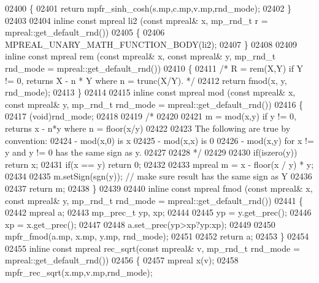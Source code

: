 \begin{DoxyCode}
{{02400 \{
02401     \textcolor{keywordflow}{return} mpfr\_sinh\_cosh(s.mp,c.mp,v.mp,rnd\_mode);
02402 \}
02403 
02404 \textcolor{keyword}{inline} \textcolor{keyword}{const} mpreal li2 (\textcolor{keyword}{const} mpreal& x, mp\_rnd\_t r = mpreal::get\_default\_rnd())
02405 \{
02406     MPREAL\_UNARY\_MATH\_FUNCTION\_BODY(li2);
02407 \}
02408 
02409 \textcolor{keyword}{inline} \textcolor{keyword}{const} mpreal rem (\textcolor{keyword}{const} mpreal& x, \textcolor{keyword}{const} mpreal& y, mp\_rnd\_t rnd\_mode = mpreal::get\_default\_rnd())
02410 \{
02411     \textcolor{comment}{/*  R = rem(X,Y) if Y != 0, returns X - n * Y where n = trunc(X/Y). */}
02412     \textcolor{keywordflow}{return} fmod(x, y, rnd\_mode);
02413 \}
02414 
02415 \textcolor{keyword}{inline} \textcolor{keyword}{const} mpreal mod (\textcolor{keyword}{const} mpreal& x, \textcolor{keyword}{const} mpreal& y, mp\_rnd\_t rnd\_mode = mpreal::get\_default\_rnd())
02416 \{
02417     (void)rnd\_mode;
02418 
02419     \textcolor{comment}{/*}
02420 \textcolor{comment}{}
02421 \textcolor{comment}{    m = mod(x,y) if y != 0, returns x - n*y where n = floor(x/y)}
02422 \textcolor{comment}{}
02423 \textcolor{comment}{    The following are true by convention:}
02424 \textcolor{comment}{    - mod(x,0) is x}
02425 \textcolor{comment}{    - mod(x,x) is 0}
02426 \textcolor{comment}{    - mod(x,y) for x != y and y != 0 has the same sign as y.}
02427 \textcolor{comment}{}
02428 \textcolor{comment}{    */}
02429 
02430     \textcolor{keywordflow}{if}(iszero(y)) \textcolor{keywordflow}{return} x;
02431     \textcolor{keywordflow}{if}(x == y) \textcolor{keywordflow}{return} 0;
02432 
02433     mpreal m = x - floor(x / y) * y;
02434 
02435     m.setSign(sgn(y)); \textcolor{comment}{// make sure result has the same sign as Y}
02436 
02437     \textcolor{keywordflow}{return} m;
02438 \}
02439 
02440 \textcolor{keyword}{inline} \textcolor{keyword}{const} mpreal fmod (\textcolor{keyword}{const} mpreal& x, \textcolor{keyword}{const} mpreal& y, mp\_rnd\_t rnd\_mode = mpreal::get\_default\_rnd())
02441 \{
02442     mpreal a;
02443     mp\_prec\_t yp, xp;
02444 
02445     yp = y.get\_prec();
02446     xp = x.get\_prec();
02447 
02448     a.set\_prec(yp>xp?yp:xp);
02449 
02450     mpfr\_fmod(a.mp, x.mp, y.mp, rnd\_mode);
02451 
02452     \textcolor{keywordflow}{return} a;
02453 \}
02454 
02455 \textcolor{keyword}{inline} \textcolor{keyword}{const} mpreal rec\_sqrt(\textcolor{keyword}{const} mpreal& v, mp\_rnd\_t rnd\_mode = mpreal::get\_default\_rnd())
02456 \{
02457     mpreal x(v);
02458     mpfr\_rec\_sqrt(x.mp,v.mp,rnd\_mode);
}}
\end{DoxyCode}
